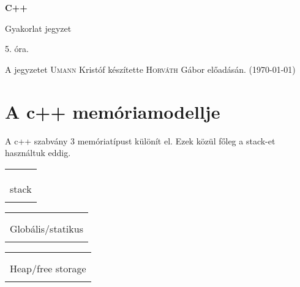 \documentclass[a4paper,11.5pt]{article}
\begin{document}
	\setlength\parindent{0pt}
	\def\s{\hspace{0.2mm}\vphantom{\beta}}
	\def\Z{\mathbb{Z}}
	\def\Q{\mathbb{Q}}
	\def\R{\mathbb{R}}
	\def\C{\mathbb{C}}
	\def\N{\mathbb{N}}
	\def\Ra{\overline{\mathbb{R}}}
	
	\def\sume{\displaystyle\sum_{n=1}^{+\infty}}
	\def\sumn{\displaystyle\sum_{n=0}^{+\infty}}
	
	\def\narrow{\underset{n\rightarrow+\infty}{\longrightarrow}}
	\def\limn{\displaystyle\lim_{n\to +\infty}}
	\def\limx{\displaystyle\lim_{x\to +\infty}}
	
	\theoremstyle{definition}
	\newtheorem{theorem}{Tétel}[subsection] 
	
	\theoremstyle{definition}
	\newtheorem{definition}[theorem]{Definíció} 
	\newtheorem{example}[theorem]{Példa} 
	\newtheorem{task}[theorem]{Feladat} 
	\newtheorem{note}[theorem]{Megjegyzés}
	\begin{center}
		{\LARGE\textbf{C++}}
		
		{\Large Gyakorlat jegyzet}
		
		5. óra.
	\end{center}
	A jegyzetet \textsc{Umann} Kristóf készítette \textsc{Horváth} Gábor  előadásán. (\today)
	\section{A c++ memóriamodellje}
	A c++ szabvány 3 memóriatípust különít el. Ezek közül főleg a stack-et használtuk eddig.
	\begin{center}
		\begin{tabular}{|c|}
			\\
			\\
			\\
			\\
			stack\\
			\\
			\hline
		\end{tabular}\quad 
		\begin{tabular}{|c|}
			\hline
			\quad \quad \\
			\\
			Globális/statikus\\
			\\
			\hline
		\end{tabular}\quad 
		\begin{tabular}{|c|}
			\hline
			\quad \quad \\
			\\
			Heap/free storage\\
			\\
			\hline
		\end{tabular}
	\end{center}
\end{document}
